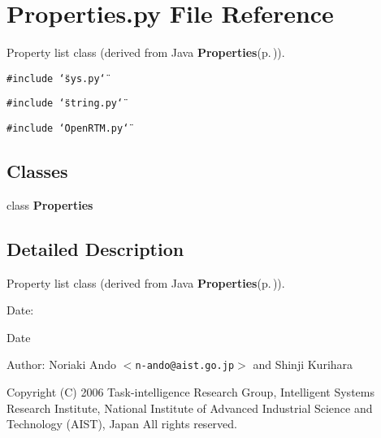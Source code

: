 \section{Properties.py File Reference}
\label{Properties_8py}
Property list class (derived from Java {\bf Properties}{\rm (p.\,\pageref{classProperties})}). 

{\tt \#include \char`\"{}sys.py\char`\"{}}\par
{\tt \#include \char`\"{}string.py\char`\"{}}\par
{\tt \#include \char`\"{}Open\-RTM.py\char`\"{}}\par
\subsection*{Classes}
\begin{CompactItemize}
\item 
class {\bf Properties}
\end{CompactItemize}


\subsection{Detailed Description}
Property list class (derived from Java {\bf Properties}{\rm (p.\,\pageref{classProperties})}). 

\begin{Desc}
\item[Date:]\begin{Desc}
\item[Date]\end{Desc}
\end{Desc}
\begin{Desc}
\item[Author:]Noriaki Ando $<${\tt n-ando@aist.go.jp}$>$ and Shinji Kurihara\end{Desc}
Copyright (C) 2006 Task-intelligence Research Group, Intelligent Systems Research Institute, National Institute of Advanced Industrial Science and Technology (AIST), Japan All rights reserved.
